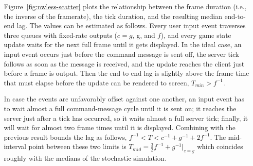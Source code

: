 Figure~\ref{fig:nwless-scatter} plots the relationship between the frame duration (i.e., the inverse of the framerate), the tick duration, and the resulting median end-to-end lag.
%
%
The values can be estimated as follows. Every user input event traverses three queues with fixed-rate outputs ($c=g$, g, and $f$), and every game state update waits for the next full frame until it gets displayed. In the ideal case, an input event occurs just before the command message is sent off, the server tick follows as soon as the message is received, and the update reaches the client just before a frame is output. Then the end-to-end lag is slightly above the frame time that must elapse before the update can be rendered to screen, $T_{min}>f^{-1}$.

In case the events are unfavorably offset against one another, an input event has to wait almost a full command-message cycle until it is sent on; it reaches the server just after a tick has occurred, so it waits almost a full server tick; finally, it will wait for almost two frame times until it is displayed. Combining with the previous result bounds the lag as follows, $f^{-1} < T < c^{-1}+g^{-1}+2f^{-1}$. The mid-interval point between these two limits is $T_{mid}=\frac{3}{2} f^{-1} + g^{-1}|_{c=g}$ which coincides roughly with the medians of the stochastic simulation.


